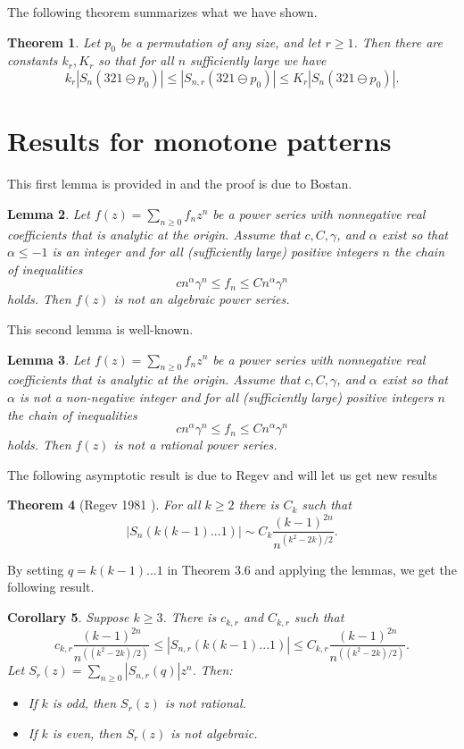 \documentclass[11pt]{amsart}
\newtheorem{theorem}{Theorem}[section]								\newtheorem{proposition}[theorem]{Proposition}
\newtheorem{lemma}[theorem]{Lemma}
\newtheorem{corollary}[theorem]{Corollary}
\theoremstyle{remark}
\numberwithin{equation}{section}
\begin{document}
The following theorem summarizes what we have shown.
\begin{theorem}
    Let $p_0$ be a permutation of any size, and let $r \geq 1$. Then there are constants $k_r, K_r$ so that for all $n$ sufficiently large we have
    \[
    k_r |S_{n}(321\ominus p_0)| \leq |S_{n,r}(321\ominus p_0)| \leq K_r |S_{n}(321\ominus p_0)|.
    \]
\end{theorem}

\section{Results for monotone patterns}
This first lemma is provided in \cite{Bona} and the proof is due to Bostan.
\begin{lemma}
    Let $f(z) = \sum_{n\geq 0} f_n z^n$ be a power series with nonnegative real coefficients that is analytic at the origin. Assume that $c,C,\gamma$, and $\alpha$ exist so that $\alpha \leq -1$ is an integer and for all (sufficiently large) positive integers $n$ the chain of inequalities
    \[
    cn^\alpha \gamma^n \leq f_n \leq Cn^\alpha \gamma^n
    \]
    holds. Then $f(z)$ is not an algebraic power series.
\end{lemma}

\vspace{10pt}
This second lemma is well-known.
\begin{lemma}
    Let $f(z) = \sum_{n\geq 0} f_n z^n$ be a power series with nonnegative real coefficients that is analytic at the origin. Assume that $c,C,\gamma$, and $\alpha$ exist so that $\alpha$ is not a non-negative integer and for all (sufficiently large) positive integers $n$ the chain of inequalities
    \[
    cn^\alpha \gamma^n \leq f_n \leq Cn^\alpha \gamma^n
    \]
    holds. Then $f(z)$ is not a rational power series.
\end{lemma}
The following asymptotic result is due to Regev and will let us get new results

\begin{theorem}[Regev 1981 \cite{Regev}]
    For all $k\geq 2$ there is $C_k$ such that
    \[
    |S_n(k(k-1)...1)| \sim C_k \frac{(k-1)^{2n}}{n^{(k^2-2k)/2}}.
    \]
\end{theorem}

\vspace{10pt}
By setting $q = k(k-1)...1$ in Theorem $3.6$ and applying the lemmas, we get the following result.
\begin{corollary}
    Suppose $k \geq 3$. There is $c_{k,r}$ and $C_{k,r}$ such that
    \[
    c_{k,r} \frac{(k-1)^{2n}}{n^{((k^2-2k)/2)}} \leq |S_{n,r}(k(k-1)...1)| \leq C_{k,r} \frac{(k-1)^{2n}}{n^{((k^2-2k)/2)}}.
    \]
    Let $S_r(z) = \sum_{n\geq 0} |S_{n,r}(q)| z^n$. Then:
        \begin{itemize}
            \item If $k$ is odd, then $S_r(z)$ is not rational.
            \item If $k$ is even, then $S_r(z)$ is not algebraic.
        \end{itemize}
\end{corollary}
\end{document}
